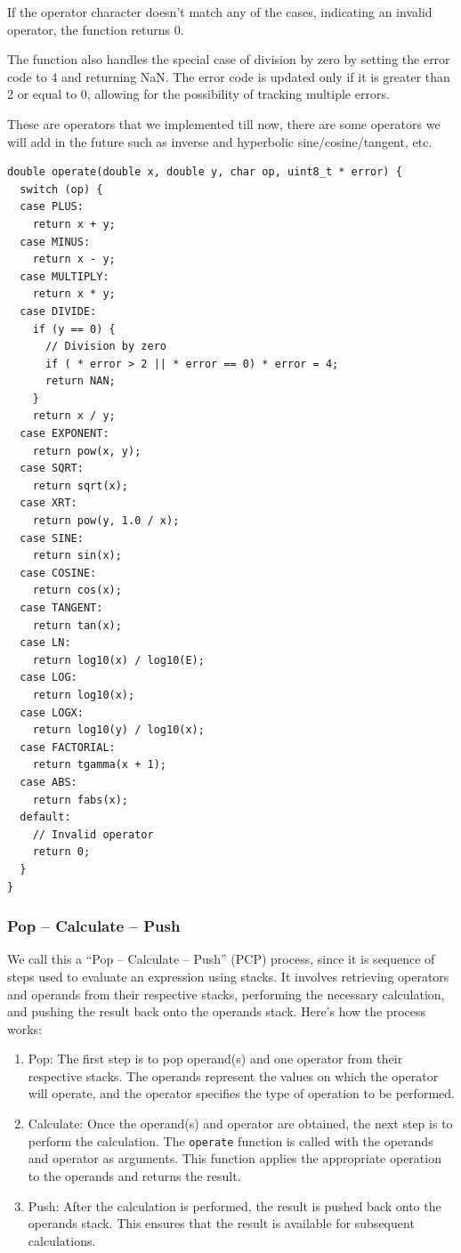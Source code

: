 \documentclass[a4paper, twoside]{report}
\begin{document}
If the operator character doesn't match any of the cases, indicating an invalid operator, the function returns 0.

The function also handles the special case of division by zero by setting the error code to 4 and returning NaN. The error code is updated only if it is greater than 2 or equal to 0, allowing for the possibility of tracking multiple errors.

These are operators that we implemented till now, there are some operators we will add in the future such as inverse and hyperbolic sine/cosine/tangent, etc.

\begin{verbatim}
double operate(double x, double y, char op, uint8_t * error) {
  switch (op) {
  case PLUS:
    return x + y;
  case MINUS:
    return x - y;
  case MULTIPLY:
    return x * y;
  case DIVIDE:
    if (y == 0) {
      // Division by zero
      if ( * error > 2 || * error == 0) * error = 4;
      return NAN;
    }
    return x / y;
  case EXPONENT:
    return pow(x, y);
  case SQRT:
    return sqrt(x);
  case XRT:
    return pow(y, 1.0 / x);
  case SINE:
    return sin(x);
  case COSINE:
    return cos(x);
  case TANGENT:
    return tan(x);
  case LN:
    return log10(x) / log10(E);
  case LOG:
    return log10(x);
  case LOGX:
    return log10(y) / log10(x);
  case FACTORIAL:
    return tgamma(x + 1);
  case ABS:
    return fabs(x);
  default:
    // Invalid operator
    return 0;
  }
}
\end{verbatim}

\subsubsection{Pop -- Calculate -- Push}
We call this a ``Pop -- Calculate -- Push'' (PCP) process, since it is sequence of steps used to evaluate an expression using stacks. It involves retrieving operators and operands from their respective stacks, performing the necessary calculation, and pushing the result back onto the operands stack. Here's how the process works:

\begin{enumerate}
    \item Pop: The first step is to pop operand(s) and one operator from their respective stacks. The operands represent the values on which the operator will operate, and the operator specifies the type of operation to be performed.
    \item Calculate: Once the operand(s) and operator are obtained, the next step is to perform the calculation. The \texttt{operate} function is called with the operands and operator as arguments. This function applies the appropriate operation to the operands and returns the result.
    \item Push: After the calculation is performed, the result is pushed back onto the operands stack. This ensures that the result is available for subsequent calculations.
\end{enumerate}
\end{document}
